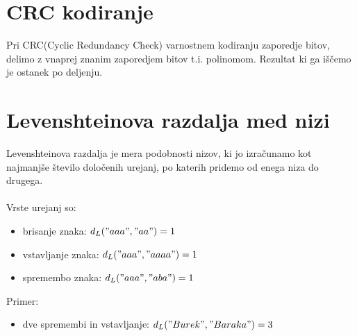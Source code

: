 \documentclass[10pt,a4paper,oneside]{book}
\newenvironment{items}{
\begin{itemize}
  \setlength{\itemsep}{1pt}
  \setlength{\parskip}{0pt}
  \setlength{\parsep}{0pt}
}{\end{itemize}}
\begin{document}
\section{CRC kodiranje}
Pri CRC(Cyclic Redundancy Check) varnostnem kodiranju zaporedje bitov, delimo z vnaprej znanim zaporedjem bitov t.i. polinomom. Rezultat ki ga iščemo je ostanek po deljenju.



\section{Levenshteinova razdalja med nizi}
Levenshteinova razdalja je mera podobnosti nizov, ki jo izračunamo kot najmanjše število določenih urejanj, po katerih pridemo od enega niza do drugega.\\
\ \\
Vrste urejanj so:
\begin{items}
\item brisanje znaka: $d_L("aaa", "aa") = 1$
\item vstavljanje znaka: $d_L("aaa", "aaaa") = 1$
\item spremembo znaka: $d_L("aaa", "aba") = 1$
\end{items}
Primer:
\begin{items}
\item dve spremembi in vstavljanje: $d_L("Burek", "Baraka") = 3$
\end{items}
\end{document}
